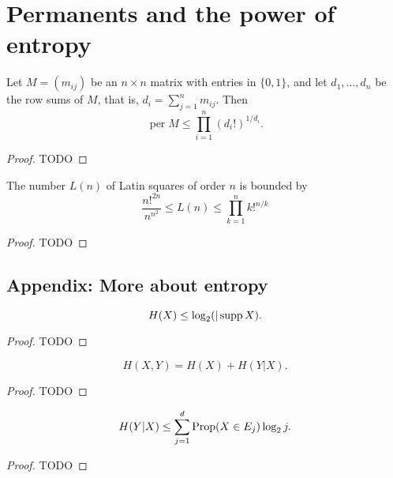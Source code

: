 \chapter{Permanents and the power of entropy}

\begin{theorem}
  \label{ch37theorem1}
  Let $M = (m_{ij})$ be an $n \times n$ matrix with entries in $\{0, 1\}$, and let $d_1, \dots, d_n$ be the row sums of $M$, that is, $d_i = \sum_{j=1}^{n} m_{ij}$. Then
\[
\operatorname{per} M \leq \prod_{i=1}^{n} (d_i!)^{1/d_i}.
\]
\end{theorem}
\begin{proof}
  TODO
\end{proof}

\begin{theorem}
  \label{ch37theorem2}
  The number $L(n)$ of Latin squares of order $n$ is bounded by
  \[
  \frac{n!^{2n}}{n^{n^2}} \le L(n) \le \prod_{k=1}^{n}k!^{n/k}
  \]
\end{theorem}
\begin{proof}
  TODO
\end{proof}

\section{Appendix: More about entropy}

\begin{theorem}[Fact A]
  \label{ch37fact_a}
  \[H(X)\le \log_2(|\operatorname{supp}{X}).\]
\end{theorem}
\begin{proof}
  TODO
\end{proof}

\begin{theorem}[Fact B]
  \label{ch37fact_b}
  \[H(X, Y) = H(X) + H(Y|X).\]
\end{theorem}
\begin{proof}
  TODO
\end{proof}

\begin{theorem}[Fact B]
  \label{ch37fact_c}
  \[H(Y|X)\le \sum_{j=1}^d \operatorname{Prop}(X\in E_j)\log_2 j.\]
\end{theorem}
\begin{proof}
  TODO
\end{proof}
